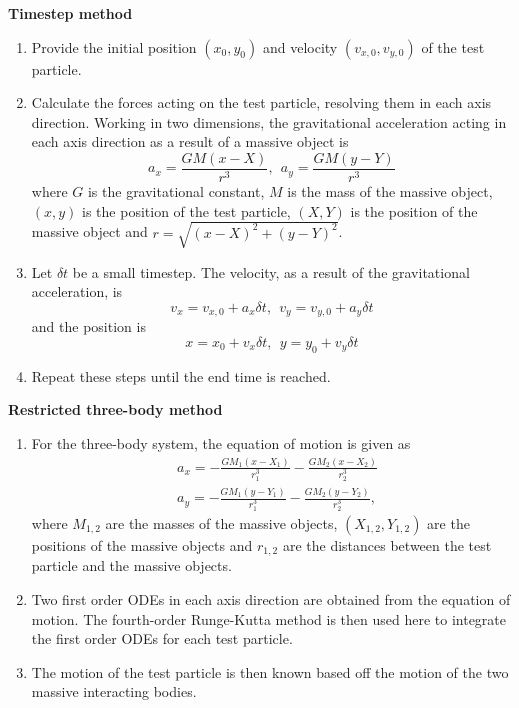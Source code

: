 \documentclass[twoside,twocolumn]{article}
\begin{document}
    \noindent \textbf{Timestep method}
    \begin{enumerate}
        \item Provide the initial position $(x_0, y_0)$ and velocity $(v_{x,0}, v_{y,0})$ of the test particle.
        \item Calculate the forces acting on the test particle, resolving them in each axis direction. Working in two dimensions, the gravitational acceleration acting in each axis direction as a result of a massive object is
        \begin{equation}
            a_{x} = \frac{GM(x - X)}{r^3}, \ \ a_{y} = \frac{GM(y - Y)}{r^3}
            \label{eqn:acceleration}
        \end{equation}
        where $G$ is the gravitational constant, $M$ is the mass of the massive object, $(x, y)$ is the position of the test particle, $(X, Y)$ is the position of the massive object and $r = \sqrt{(x - X)^2 + (y - Y)^2}$. 
        \item Let $\delta t$ be a small timestep. The velocity, as a result of the gravitational acceleration, is
        \begin{equation}
            v_x = v_{x,0} + a_{x} \delta t, \ \ v_y = v_{y,0} + a_{y} \delta t
        \end{equation}
        and the position is
        \begin{equation}
            x = x_0 + v_x \delta t, \ \ y = y_0 + v_y \delta t
        \end{equation}
        \item Repeat these steps until the end time is reached.
    \end{enumerate}
    \vspace{0.2cm}

    \noindent \textbf{Restricted three-body method}
    \begin{enumerate}
        \item For the three-body system, the equation of motion is given as \cite{three_body}
        \begin{equation}
            \begin{split}
                &a_{x} = - \frac{GM_1(x - X_1)}{r_1^3} - \frac{GM_2(x - X_2)}{r_2^3} \\
                &a_{y} = - \frac{GM_1(y - Y_1)}{r_1^3} - \frac{GM_2(y - Y_2)}{r_2^3},
            \end{split}
        \end{equation}
        where $M_{1,2}$ are the masses of the massive objects, $(X_{1, 2}, Y_{1, 2})$ are the positions of the massive objects and $r_{1, 2}$ are the distances between the test particle and the massive objects. 
        \item Two first order ODEs in each axis direction are obtained from the equation of motion. The fourth-order Runge-Kutta method is then used here to integrate the first order ODEs for each test particle.
        \item The motion of the test particle is then known based off the motion of the two massive interacting bodies.
    \end{enumerate}
    
\end{document}
